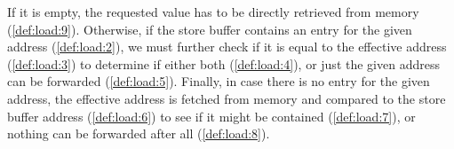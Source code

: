 If it is empty, the requested value has to be directly retrieved from memory (\ref{def:load:9}).
Otherwise, if the store buffer contains an entry for the given address (\ref{def:load:2}), we must further check if it is equal to the effective address (\ref{def:load:3}) to determine if either both (\ref{def:load:4}), or just the given address can be forwarded (\ref{def:load:5}).
Finally, in case there is no entry for the given address,
the effective address is fetched from memory and compared to the store buffer address (\ref{def:load:6}) to see if it
might be contained (\ref{def:load:7}), or nothing can be forwarded after all (\ref{def:load:8}).


